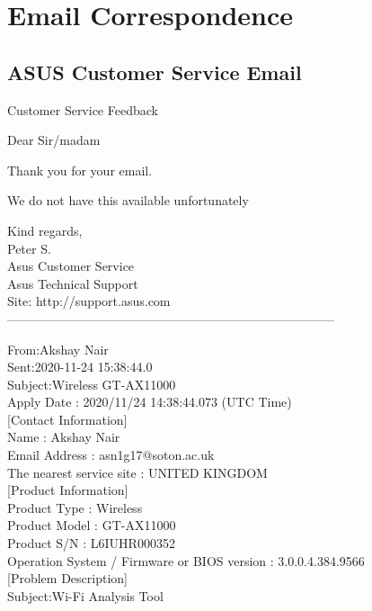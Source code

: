 \chapter{Email Correspondence} 

\section{ASUS Customer Service Email} \label{ASUSEmail}

{\selectfont
Customer Service Feedback


Dear Sir/madam



Thank you for your email.



We do not have this available unfortunately 






Kind regards,\\
Peter S.\\
Asus Customer Service\\
Asus Technical Support \\
Site: http://support.asus.com\\
------------------------------------------------------------------------------

From:Akshay Nair\\
Sent:2020-11-24 15:38:44.0\\
Subject:Wireless GT-AX11000\\
Apply Date : 2020/11/24 14:38:44.073 (UTC Time)\\

[Contact Information]\\
Name : Akshay Nair\\
Email Address : asn1g17@soton.ac.uk\\
The nearest service site : UNITED KINGDOM\\

[Product Information]\\
Product Type : Wireless\\
Product Model : GT-AX11000\\
Product S/N : L6IUHR000352\\
Operation System / Firmware or BIOS version : 3.0.0.4.384.9566\\

[Problem Description]\\
Subject:Wi-Fi Analysis Tool\\

}
